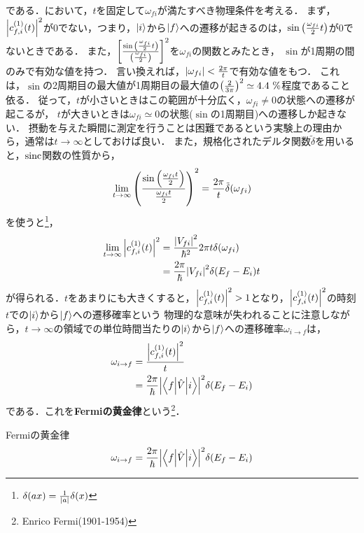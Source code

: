 \documentclass{report}
\begin{document}
  である．において，$t$を固定して$\omega_{fi}$が満たすべき物理条件を考える．
  まず，$\abs{c_{f, i}^{(1)}(t)}^2$が0でない，つまり，$\ket{i}$から$\ket{f}$への遷移が起きるのは，$\sin\qty(\frac{\omega_{fi}}{2}t)$が0でないときである．
  また，$\qty[\frac{\sin\qty(\frac{\omega_{fi}}{2}t)}{\qty(\frac{\omega_{fi}}{2})}]^2$を$\omega_{fi}$の関数とみたとき，
  $\sin$が1周期の間のみで有効な値を持つ．
  言い換えれば，$\abs{\omega_{fi}} < \frac{2\pi}{t}$で有効な値をもつ．
  これは，$\sin$の2周期目の最大値が1周期目の最大値の$\qty(\frac{2}{3\pi})^2\simeq 4.4\ \%$程度であること依る．
  従って，$t$が小さいときはこの範囲が十分広く，$\omega_{fi} \neq 0$の状態への遷移が起こるが，
  $t$が大きいときは$\omega_{fi}\simeq 0$の状態($\sin$の1周期目)への遷移しか起きない．
  摂動を与えた瞬間に測定を行うことは困難であるという実験上の理由から，通常は$t \to \infty$としておけば良い．
  また，規格化されたデルタ関数$\tilde{\delta}$を用いると，$\mathrm{sinc}$関数の性質から，
  \begin{align}
    \lim_{t\to\infty}\qty(\frac{\sin\qty(\frac{\omega_{fi} t}{2})}{\frac{\omega_{fi} t}{2}})^2 = \frac{2\pi}{t}\tilde{\delta}(\omega_{fi})
  \end{align}
  を使うと\footnote{$\delta(ax)=\frac{1}{\abs{a}}\delta(x)$}，
  \begin{align}
    \lim_{t\to\infty}\abs{c_{f, i}^{(1)}(t)}^2 &= \frac{\abs{V_{fi}}^2}{\hbar^2}2\pi t\delta(\omega_{fi})\\
    &= \frac{2\pi}{\hbar}\abs{V_{fi}}^2\delta(E_f - E_i)t
  \end{align}
  が得られる．$t$をあまりにも大きくすると，$\abs{c_{f, i}^{(1)}(t)}^2 > 1$となり，$\abs{c_{f, i}^{(1)}(t)}^2$の時刻$t$での$\ket{i}$から$\ket{f}$への遷移確率という
  物理的な意味が失われることに注意しながら，$t\to \infty$の領域での単位時間当たりの$\ket{i}$から$\ket{f}$への遷移確率$\omega_{i\to f}$は，
  \begin{align}
    \omega_{i\to f} &= \frac{\abs{c_{f, i}^{(1)}(t)}^2}{t} \\
    &= \frac{2\pi}{\hbar}\abs{\mel**{f}{\hat{V}}{i}}^2\delta(E_f - E_i)
  \end{align}
  である．これを\textbf{Fermiの黄金律}という\footnote{Enrico Fermi(1901-1954)}．
  \begin{itembox}[l]{Fermiの黄金律}
    \begin{align}
      \omega_{i\to f} = \frac{2\pi}{\hbar}\abs{\mel**{f}{\hat{V}}{i}}^2\delta(E_f - E_i)\label{fermis-golden-rule}
    \end{align}
  \end{itembox}
\end{document}
